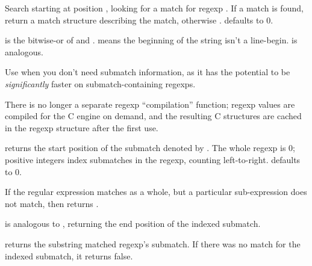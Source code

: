 \begin{desc}
    Search  starting at position , looking for a match
    for regexp . If a match is found, return a match structure describing
    the match, otherwise {\sharpf}.  defaults to 0.

     is the bitwise-or of  and
    .
     means the beginning of the string isn't a
    line-begin.  is analogous. 

    Use  when you don't need submatch information, as
    it has the potential to be \emph{significantly} faster on 
    submatch-containing regexps.

    There is no longer a separate regexp ``compilation'' function; regexp
    values are compiled for the C engine on demand, and the resulting
    C structures are cached in the regexp structure after the first use.
\end{desc}

\begin{desc}
     returns the start position of the submatch denoted by 
    .
    The whole regexp is 0; positive integers index submatches in the
    regexp, counting left-to-right.
     defaults to 0.

    If the regular expression matches as a whole, 
    but a particular sub-expression does not match, then
     returns {\sharpf}.

     is analogous to , returning the end
    position of the indexed submatch.

     returns the substring matched regexp's submatch.
    If there was no match for the indexed submatch, it returns false.
\end{desc}

